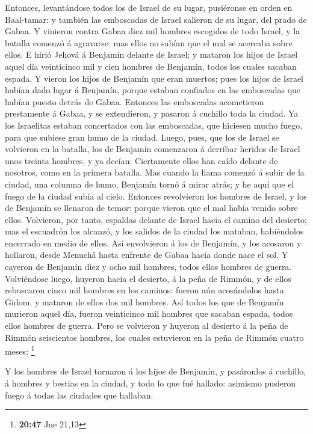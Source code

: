  Entonces, levantándose todos los de Israel de su lugar,
pusiéronse en orden en Baal-tamar: y también las emboscadas de Israel
salieron de su lugar, del prado de Gabaa.  Y vinieron
contra Gabaa diez mil hombres escogidos de todo Israel, y la batalla
comenzó á agravarse: mas ellos no sabían que el mal se acercaba sobre
ellos.  E hirió Jehová á Benjamín delante de Israel; y
mataron los hijos de Israel aquel día veinticinco mil y cien hombres de
Benjamín, todos los cuales sacaban espada.  Y vieron los
hijos de Benjamín que eran muertos; pues los hijos de Israel habían dado
lugar á Benjamín, porque estaban confiados en las emboscadas que habían
puesto detrás de Gabaa.  Entonces las emboscadas
acometieron prestamente á Gabaa, y se extendieron, y pasaron á cuchillo
toda la ciudad.  Ya los Israelitas estaban concertados con
las emboscadas, que hiciesen mucho fuego, para que subiese gran humo de
la ciudad.  Luego, pues, que los de Israel se volvieron en
la batalla, los de Benjamín comenzaron á derribar heridos de Israel unos
treinta hombres, y ya decían: Ciertamente ellos han caído delante de
nosotros, como en la primera batalla.  Mas cuando la llama
comenzó á subir de la ciudad, una columna de humo, Benjamín tornó á
mirar atrás; y he aquí que el fuego de la ciudad subía al cielo.
 Entonces revolvieron los hombres de Israel, y los de
Benjamín se llenaron de temor: porque vieron que el mal había venido
sobre ellos.  Volvieron, por tanto, espaldas delante de
Israel hacia el camino del desierto; mas el escuadrón los alcanzó, y los
salidos de la ciudad los mataban, habiéndolos encerrado en medio de
ellos.  Así envolvieron á los de Benjamín, y los acosaron y
hollaron, desde Menuchâ hasta enfrente de Gabaa hacia donde nace el sol.
 Y cayeron de Benjamín diez y ocho mil hombres, todos ellos
hombres de guerra.  Volviéndose luego, huyeron hacia el
desierto, á la peña de Rimmón, y de ellos rebuscaron cinco mil hombres
en los caminos: fueron aún acosándolos hasta Gidom, y mataron de ellos
dos mil hombres.  Así todos los que de Benjamín murieron
aquel día, fueron veinticinco mil hombres que sacaban espada, todos
ellos hombres de guerra.  Pero se volvieron y huyeron al
desierto á la peña de Rimmón seiscientos hombres, los cuales estuvieron
en la peña de Rimmón cuatro meses: \footnote{\textbf{20:47} Jue 21,13}

 Y los hombres de Israel tornaron á los hijos de Benjamín,
y pasáronlos á cuchillo, á hombres y bestias en la ciudad, y todo lo que
fué hallado: asimismo pusieron fuego á todas las ciudades que hallaban.

